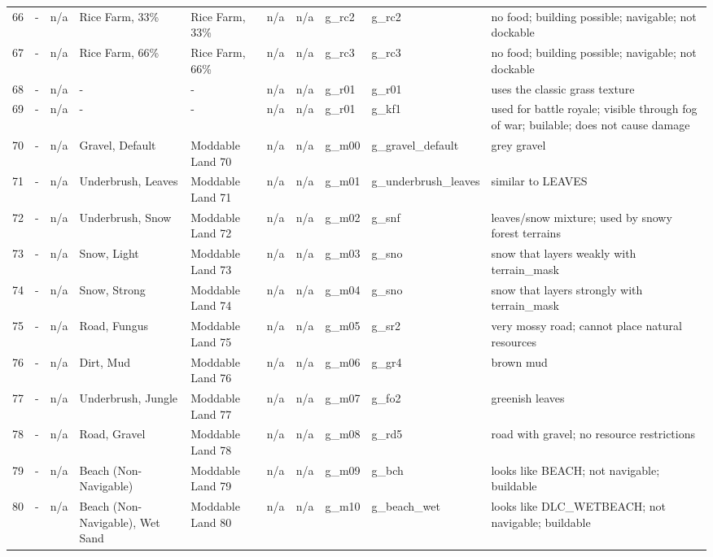 \begin{appendices}
\begin{landscape}
\begin{longtable}{@{}p{5mm}|p{25mm}p{23mm}|p{14mm}p{14mm}p{14mm}p{14mm}|p{10mm}p{15mm}|p{45mm}@{}}
            66	& -	& n/a	& Rice Farm, 33\%	& Rice Farm, 33\%	& n/a	& n/a	& g\_rc2	& g\_rc2		& no food; building possible; navigable; not dockable \\
            67	& -	& n/a	& Rice Farm, 66\%	& Rice Farm, 66\%	& n/a	& n/a	& g\_rc3	& g\_rc3		& no food; building possible; navigable; not dockable \\
            68	& -	& n/a	& -	& -	& n/a	& n/a	& g\_r01	& g\_r01		& uses the classic grass texture \\
            69	& -	& n/a	& -	& -	& n/a	& n/a	& g\_r01	& g\_kf1		& used for battle royale; visible through fog of war; builable; does not cause damage \\
            70	& -	& n/a	& Gravel, Default	& Moddable Land 70	& n/a	& n/a	& g\_m00	& g\_gravel\_default		& grey gravel \\
            71	& -	& n/a	& Underbrush, Leaves	& Moddable Land 71	& n/a	& n/a	& g\_m01	& g\_underbrush\_leaves		& similar to LEAVES \\
            72	& -	& n/a	& Underbrush, Snow	& Moddable Land 72	& n/a	& n/a	& g\_m02	& g\_snf		& leaves/snow mixture; used by snowy forest terrains \\
            73	& -	& n/a	& Snow, Light	& Moddable Land 73	& n/a	& n/a	& g\_m03	& g\_sno		& snow that layers weakly with terrain\_mask \\
            74	& -	& n/a	& Snow, Strong	& Moddable Land 74	& n/a	& n/a	& g\_m04	& g\_sno		& snow that layers strongly with terrain\_mask \\
            75	& -	& n/a	& Road, Fungus	& Moddable Land 75	& n/a	& n/a	& g\_m05	& g\_sr2		& very mossy road; cannot place natural resources \\
            76	& -	& n/a	& Dirt, Mud	& Moddable Land 76	& n/a	& n/a	& g\_m06	& g\_gr4		& brown mud \\
            77	& -	& n/a	& Underbrush, Jungle	& Moddable Land 77	& n/a	& n/a	& g\_m07	& g\_fo2		& greenish leaves \\
            78	& -	& n/a	& Road, Gravel	& Moddable Land 78	& n/a	& n/a	& g\_m08	& g\_rd5		& road with gravel; no resource restrictions \\
            79	& -	& n/a	& Beach (Non-Navigable)	& Moddable Land 79	& n/a	& n/a	& g\_m09	& g\_bch		& looks like BEACH; not navigable; buildable \\
            80	& -	& n/a	& Beach (Non-Navigable), Wet Sand	& Moddable Land 80	& n/a	& n/a	& g\_m10	& g\_beach\_wet		& looks like DLC\_WETBEACH; not navigable; buildable \\

\end{longtable}
\end{landscape}
\end{appendices}

